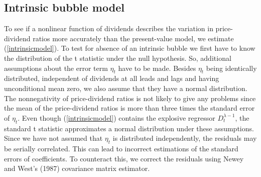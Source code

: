 \documentclass{article}
\begin{document}
\subsection{Intrinsic bubble model}
To see if a nonlinear function of dividends describes the variation in price-dividend ratios more accurately than the present-value model, we estimate (\ref{intrinsicmodel}). To test for absence of an intrinsic bubble we first have to know the distribution of the t statistic under the null hypothesis. So, additional assumptions about the error term $\eta_t$ have to be made. Besides $\eta_t$ being identically distributed, independent of dividends at all leads and lags and having unconditional mean zero, we also assume that they have a normal distribution. The nonnegativity of price-dividend ratios is not likely to give any problems since the mean of the price-dividend ratios is more than three times the standard error of $\eta_t$. Even though (\ref{intrinsicmodel}) contains the explosive regressor $D_t^{\lambda - 1}$, the standard t statistic approximates a normal distribution under these assumptions\footnotemark. 
\\
Since we have not assumed that $\eta_t$ is distributed independently, the residuals may be serially correlated. This can lead to incorrect estimations of the standard errors of coefficients. To counteract this, we correct the residuals using Newey and West's (1987) covariance matrix estimator.
\end{document}
